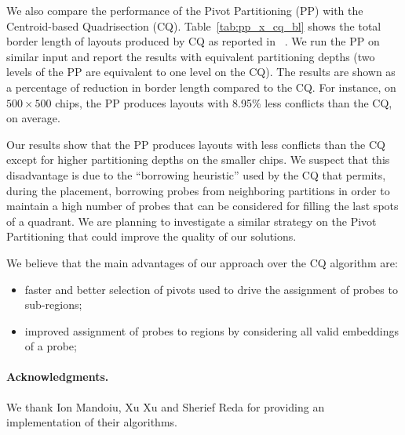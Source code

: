 \documentclass{llncs}
\newcommand{\ignore}[1]{}
\begin{document}
\ignore{
Tables~\ref{tab:pp_affy_bl} and~\ref{tab:pp_affy_ci} shows the results of running PP on chips
containing probe sets of existing Affymetrix GeneChip arrays -- E.Coli 2.0 Genome (EC2), Porcine
Genome (POR) and Wheat Genome (WHT) -- whose probes are synchronously embedded in a deposition
sequence of length 74. Table~\ref{tab:pp_affy_bl} shows the normalized border length
(total border length divided by the number of probes) while Table~\ref{tab:pp_affy_ci} shows
the average conflict index.
} %

We also compare the performance of the Pivot Partitioning (PP) with the
Centroid-based Quadrisection (CQ). Table~\ref{tab:pp_x_cq_bl} shows the total border
length of layouts produced by CQ as reported in ~\cite{KAHNG03B}. We run the PP
on similar input and report the results with equivalent partitioning depths
(two levels of the PP are equivalent to one level on the CQ). The results are shown
as a percentage of reduction in border length compared to the CQ. For instance,
on $500\times 500$ chips, the PP produces layouts with 8.95\% less conflicts than
the CQ, on average.

Our results
show that the PP produces layouts with less conflicts than the CQ except for higher
partitioning depths on the smaller chips. We suspect that this disadvantage is
due to the ``borrowing heuristic'' used by the CQ that permits, during the placement,
borrowing probes from neighboring partitions in order to maintain a high number
of probes that can be considered for filling the last spots of a quadrant. We are
planning to investigate a similar strategy on the Pivot Partitioning that could improve
the quality of our solutions.

We believe that the main advantages of our approach over the CQ algorithm are:
\begin{itemize}
\item faster and better selection of pivots used to drive
the assignment of probes to sub-regions;
\item improved assignment of probes to regions by considering all valid embeddings
of a probe;
\end{itemize}

\paragraph{Acknowledgments.}We thank Ion Mandoiu, Xu Xu and Sherief Reda for
providing an implementation of their algorithms.
\end{document}

